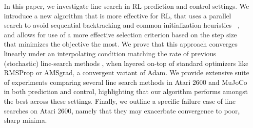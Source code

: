 \documentclass{article}
\begin{document}
In this paper, we investigate line search in RL prediction and control settings. 
We introduce a new algorithm that is more effective for RL, that uses a parallel search to  avoid sequential backtracking and common initialization heuristics ~\citep{vaswani2019painless,galli2023monotone}, and allows for use of a more effective selection criterion based on the step size that minimizes the objective the most. 
We prove that this approach converges linearly under an interpolating condition matching the rate of previous (stochastic) line-search methods \citep{vaswani2019painless,galli2023monotone}, when layered on-top of standard optimizers like RMSProp or AMSgrad, a convergent variant of Adam. 
We provide extensive suite of experiments comparing several line search methods in Atari 2600 and MuJoCo in both prediction and control, highlighting that our algorithm performs amongst the best across these settings. 
Finally, we outline a specific failure case of line searches on Atari 2600, namely that they may exacerbate convergence to poor, sharp minima.
 
\end{document}

